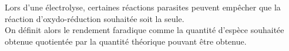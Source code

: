 ﻿\documentclass[a4paper]{article}
\begin{document}
\pagestyle{fancy}
\fancyhf{}
\setlength{\headheight}{15pt}

\begin{center}
	\large{}
\end{center}


Lors d'une électrolyse, certaines réactions parasites peuvent empêcher que la réaction d'oxydo-réduction souhaitée soit la seule.\\
On définit alors le rendement faradique comme la quantité d'espèce souhaitée obtenue quotientée par la quantité théorique pouvant être obtenue.
\end{document}
